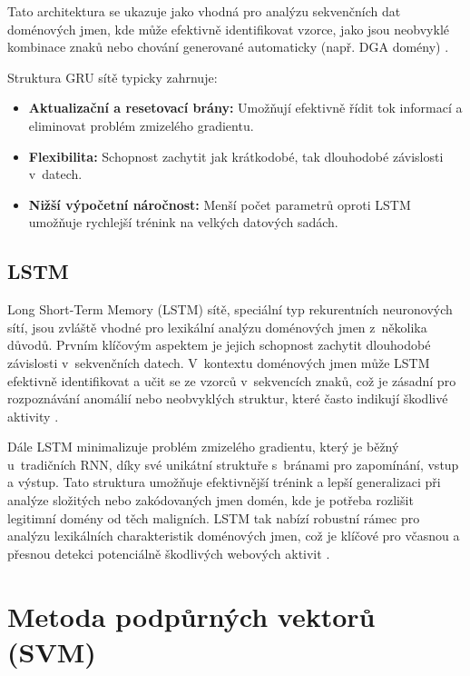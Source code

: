 Tato architektura se ukazuje jako vhodná pro analýzu sekvenčních dat doménových jmen, kde může efektivně identifikovat vzorce, jako jsou neobvyklé kombinace znaků nebo chování generované automaticky (např. DGA domény) \cite{cnn_gru_attention}.

Struktura GRU sítě typicky zahrnuje:
\begin{itemize}
    \item \textbf{Aktualizační a resetovací brány:} Umožňují efektivně řídit tok informací a eliminovat problém zmizelého gradientu.
    \item \textbf{Flexibilita:} Schopnost zachytit jak krátkodobé, tak dlouhodobé závislosti v~datech.
    \item \textbf{Nižší výpočetní náročnost:} Menší počet parametrů oproti LSTM umožňuje rychlejší trénink na velkých datových sadách.
\end{itemize}

\subsection{LSTM}

Long Short-Term Memory (LSTM) sítě, speciální typ rekurentních neuronových sítí, jsou zvláště vhodné pro lexikální analýzu doménových jmen z~několika důvodů. Prvním klíčovým aspektem je jejich schopnost zachytit dlouhodobé závislosti v~sekvenčních datech. V~kontextu doménových jmen může LSTM efektivně identifikovat a učit se ze vzorců v~sekvencích znaků, což je zásadní pro rozpoznávání anomálií nebo neobvyklých struktur, které často indikují škodlivé aktivity \cite{hochreiter1997lstm}.

Dále LSTM minimalizuje problém zmizelého gradientu, který je běžný u~tradičních RNN, díky své unikátní struktuře s~bránami pro zapomínání, vstup a výstup. Tato struktura umožňuje efektivnější trénink a lepší generalizaci při analýze složitých nebo zakódovaných jmen domén, kde je potřeba rozlišit legitimní domény od těch maligních. LSTM tak nabízí robustní rámec pro analýzu lexikálních charakteristik doménových jmen, což je klíčové pro včasnou a přesnou detekci potenciálně škodlivých webových aktivit \cite{cnn_gru_attention}.








\section{Metoda podpůrných vektorů (SVM)}


